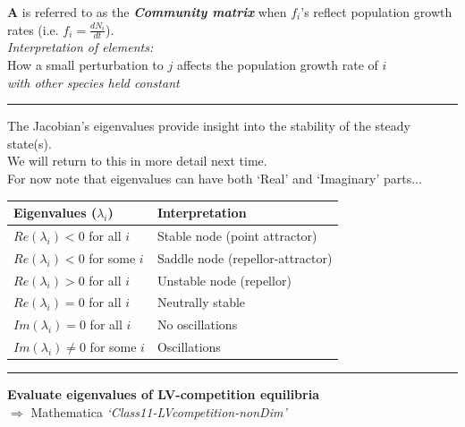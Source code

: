 \documentclass{article}
\newcommand{\note}[1]{\colorbox{gray!30}{#1}}
\newcommand{\ind}{\-\hspace{1cm}}
\begin{document}
\textbf{A} is referred to as the \emph{\textbf{Community matrix}} when $f_i$'s reflect population growth rates (i.e. $f_i=\tfrac{dN_i}{dt}$).\\

\emph{Interpretation of elements:}\\
\ind How a small perturbation to $j$ affects the population growth rate of $i$\\
\ind \ind \ind \ind \ind \ind  \ind \ind \ind \emph{with other species held constant}\\

\rule[0.5ex]{\linewidth}{1pt}

\pagebreak

The Jacobian's eigenvalues provide insight into the stability of the steady state(s).\\
We will return to this in more detail next time.\\
\ind For now note that eigenvalues can have both `Real' and `Imaginary' parts...

\begin{center}
	\begin{tabular}{ll}
		\hline
		\textbf{Eigenvalues ($\lambda_i$)} & \textbf{Interpretation} \\ 
		\hline
		$Re(\lambda_i)< 0$  for all $i$& Stable node (point attractor)\\ 
		$Re(\lambda_i)< 0$ for some $i$ & Saddle node (repellor-attractor) \\ 
		$Re(\lambda_i)> 0$ for all $i$ & Unstable node (repellor)\\ 
		$Re(\lambda_i) = 0$ for all $i$ & Neutrally stable \\ 
		\hline
		$Im(\lambda_i) = 0$ for all $i$ & No oscillations \\ 
		$Im(\lambda_i) \neq 0$ for some $i$  & Oscillations \\ 
		\hline
	\end{tabular} 
\end{center}

\rule[0.5ex]{\linewidth}{1pt}

\textbf{Evaluate eigenvalues of LV-competition equilibria}\\
\ind \note{$\Rightarrow$ Mathematica \emph{`Class11-LVcompetition-nonDim'}}\\
\end{document}
